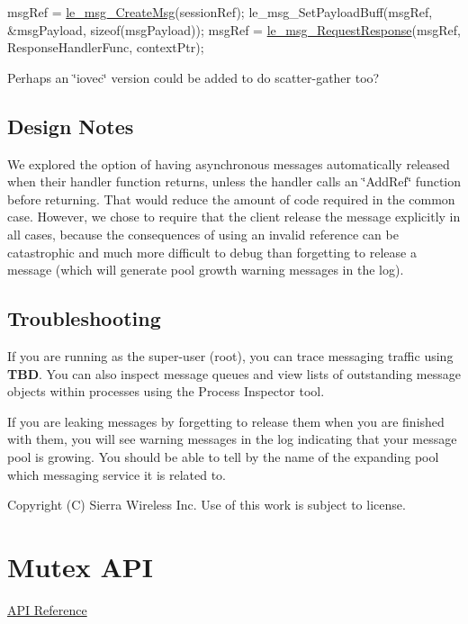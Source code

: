 \begin{DoxyCode}
msgRef = \hyperlink{le__messaging_8h_a8293a69f256b98cbce5b9990ea3520f3}{le\_msg\_CreateMsg}(sessionRef);
le\_msg\_SetPayloadBuff(msgRef, &msgPayload, \textcolor{keyword}{sizeof}(msgPayload));
msgRef = \hyperlink{le__messaging_8h_a5440ae06a89b60ed04e9de5601496608}{le\_msg\_RequestResponse}(msgRef, ResponseHandlerFunc, contextPtr);
\end{DoxyCode}


Perhaps an \char`\"{}iovec\char`\"{} version could be added to do scatter-\/gather too?\hypertarget{c_messaging_c_messagingDesignNotes}{}\subsection{Design Notes}\label{c_messaging_c_messagingDesignNotes}
We explored the option of having asynchronous messages automatically released when their handler function returns, unless the handler calls an \char`\"{}\+Add\+Ref\char`\"{} function before returning. That would reduce the amount of code required in the common case. However, we chose to require that the client release the message explicitly in all cases, because the consequences of using an invalid reference can be catastrophic and much more difficult to debug than forgetting to release a message (which will generate pool growth warning messages in the log).\hypertarget{c_messaging_c_messagingTroubleshooting}{}\subsection{Troubleshooting}\label{c_messaging_c_messagingTroubleshooting}
If you are running as the super-\/user (root), you can trace messaging traffic using {\bfseries T\+B\+D}. You can also inspect message queues and view lists of outstanding message objects within processes using the Process Inspector tool.

If you are leaking messages by forgetting to release them when you are finished with them, you will see warning messages in the log indicating that your message pool is growing. You should be able to tell by the name of the expanding pool which messaging service it is related to.





Copyright (C) Sierra Wireless Inc. Use of this work is subject to license. \hypertarget{c_mutex}{}\section{Mutex A\+P\+I}\label{c_mutex}
\hyperlink{le__mutex_8h}{A\+P\+I Reference}





